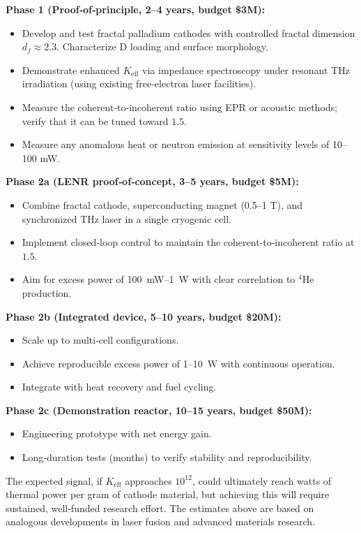 \documentclass[12pt]{article}
\theoremstyle{remark}
\newcommand{\Keff}{K_{\mathrm{eff}}}
\begin{document}
	\textbf{Phase 1 (Proof‑of‑principle, 2–4 years, budget \$3M):}
	\begin{itemize}
		\item Develop and test fractal palladium cathodes with controlled fractal dimension \(d_f \approx 2.3\). Characterize D loading and surface morphology.
		\item Demonstrate enhanced \(\Keff\) via impedance spectroscopy under resonant THz irradiation (using existing free‑electron laser facilities).
		\item Measure the coherent‑to‑incoherent ratio using EPR or acoustic methods; verify that it can be tuned toward \(1.5\).
		\item Measure any anomalous heat or neutron emission at sensitivity levels of 10–100 mW.
	\end{itemize}
	
	\textbf{Phase 2a (LENR proof‑of‑concept, 3–5 years, budget \$5M):}
	\begin{itemize}
		\item Combine fractal cathode, superconducting magnet (0.5–1 T), and synchronized THz laser in a single cryogenic cell.
		\item Implement closed‑loop control to maintain the coherent‑to‑incoherent ratio at \(1.5\).
		\item Aim for excess power of 100~mW--1~W with clear correlation to \(^4\)He production.
	\end{itemize}
	
	\textbf{Phase 2b (Integrated device, 5–10 years, budget \$20M):}
	\begin{itemize}
		\item Scale up to multi‑cell configurations.
		\item Achieve reproducible excess power of 1--10~W with continuous operation.
		\item Integrate with heat recovery and fuel cycling.
	\end{itemize}
	
	\textbf{Phase 2c (Demonstration reactor, 10–15 years, budget \$50M):}
	\begin{itemize}
		\item Engineering prototype with net energy gain.
		\item Long‑duration tests (months) to verify stability and reproducibility.
	\end{itemize}
	
	The expected signal, if \(\Keff\) approaches \(10^{12}\), could ultimately reach watts of thermal power per gram of cathode material, but achieving this will require sustained, well‑funded research effort. The estimates above are based on analogous developments in laser fusion and advanced materials research.
	
\end{document}
